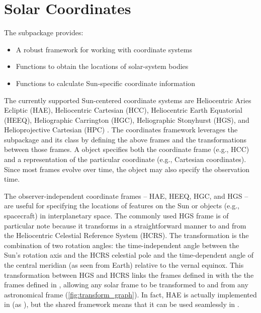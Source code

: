\section{Solar Coordinates}
\label{sec:coords}

The  subpackage provides:
\begin{itemize}
    \item A robust framework for working with coordinate systems
    \item Functions to obtain the locations of solar-system bodies
    \item Functions to calculate Sun-specific coordinate information
\end{itemize}
The currently supported Sun-centered coordinate systems are Heliocentric Aries Ecliptic (HAE), Heliocentric Cartesian (HCC), Heliocentric Earth Equatorial (HEEQ), Heliographic Carrington (HGC), Heliographic Stonyhurst (HGS), and Helioprojective Cartesian (HPC) \citep[see][]{2006A&A...449..791T}.
The coordinates framework leverages the  subpackage and its  class \citep[see Section 3.3 of][]{astropy2018} by defining the above frames and the transformations between those frames.
A  object specifies both the coordinate frame (e.g., HCC) and a representation of the particular coordinate (e.g., Cartesian coordinates).
Since most frames evolve over time, the  object may also specify the observation time.

The observer-independent coordinate frames -- HAE, HEEQ, HGC, and HGS -- are useful for specifying the locations of features on the Sun or objects (e.g., spacecraft) in interplanetary space.
The commonly used HGS frame is of particular note because it transforms in a straightforward manner to and from the Heliocentric Celestial Reference System (HCRS).
The transformation is the combination of two rotation angles: the time-independent angle between the Sun's rotation axis and the HCRS celestial pole \citep[see][]{2007CeMDA..98..155S} and the time-dependent angle of the central meridian (as seen from Earth) relative to the vernal equinox.
This transformation between HGS and HCRS links the frames defined in  with the the frames defined in , allowing any solar frame to be transformed to and from any astronomical frame (\autoref{fig:transform_graph}).
In fact, HAE is actually implemented in  (as ), but the shared framework means that it can be used seamlessly in \sunpy.

